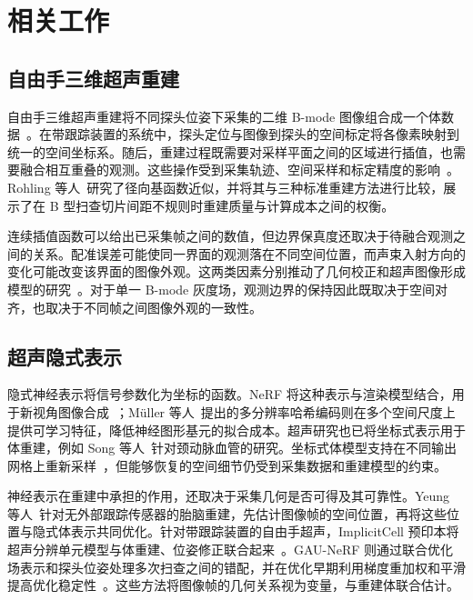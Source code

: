 \section{相关工作}
\label{sec:related-work}

\subsection{自由手三维超声重建}

自由手三维超声重建将不同探头位姿下采集的二维 B-mode 图像组合成一个体数据~\cite{prager2010three}。在带跟踪装置的系统中，探头定位与图像到探头的空间标定将各像素映射到统一的空间坐标系。随后，重建过程既需要对采样平面之间的区域进行插值，也需要融合相互重叠的观测。这些操作受到采集轨迹、空间采样和标定精度的影响~\cite{solberg2007freehand}。Rohling 等人~\cite{rohling1999interpolation}研究了径向基函数近似，并将其与三种标准重建方法进行比较，展示了在 B 型扫查切片间距不规则时重建质量与计算成本之间的权衡。

连续插值函数可以给出已采集帧之间的数值，但边界保真度还取决于待融合观测之间的关系。配准误差可能使同一界面的观测落在不同空间位置，而声束入射方向的变化可能改变该界面的图像外观。这两类因素分别推动了几何校正和超声图像形成模型的研究~\cite{dou2026gau,wysocki2024ultranerf}。对于单一 B-mode 灰度场，观测边界的保持因此既取决于空间对齐，也取决于不同帧之间图像外观的一致性。

\subsection{超声隐式表示}

隐式神经表示将信号参数化为坐标的函数。NeRF 将这种表示与渲染模型结合，用于新视角图像合成~\cite{mildenhall2020nerf}；M\"uller 等人~\cite{mueller2022instant}提出的多分辨率哈希编码则在多个空间尺度上提供可学习特征，降低神经图形基元的拟合成本。超声研究也已将坐标式表示用于体重建，例如 Song 等人~\cite{song2022carotid}针对颈动脉血管的研究。坐标式体模型支持在不同输出网格上重新采样~\cite{yeung2024sensorless}，但能够恢复的空间细节仍受到采集数据和重建模型的约束。

神经表示在重建中承担的作用，还取决于采集几何是否可得及其可靠性。Yeung 等人~\cite{yeung2024sensorless}针对无外部跟踪传感器的胎脑重建，先估计图像帧的空间位置，再将这些位置与隐式体表示共同优化。针对带跟踪装置的自由手超声，ImplicitCell 预印本将超声分辨单元模型与体重建、位姿修正联合起来~\cite{song2025implicitcell}。GAU-NeRF 则通过联合优化场表示和探头位姿处理多次扫查之间的错配，并在优化早期利用梯度重加权和平滑提高优化稳定性~\cite{dou2026gau}。这些方法将图像帧的几何关系视为变量，与重建体联合估计。

